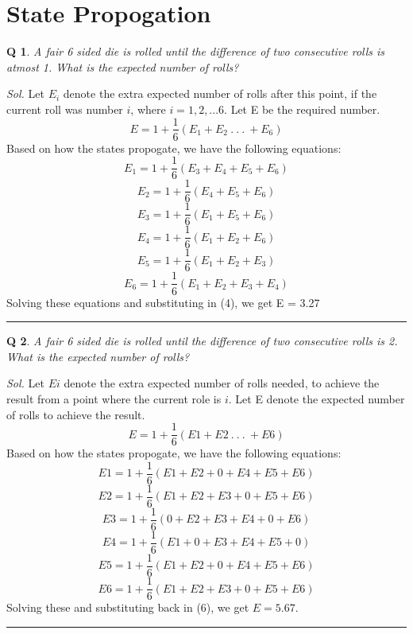 \documentclass[DIV=15, fleqn, oneside, 8pt]{scrartcl}
\theoremstyle{clean}
\newtheorem{question}{Q} %
\newenvironment{solution}
{\par\textit{Sol.} }     %
{\par\medskip\hrule\bigskip}
\begin{document}
\section*{State Propogation}
\begin{question}
A fair 6 sided die is rolled until the difference of two consecutive rolls is atmost 1. What is
the expected number of rolls?
\end{question}
\begin{solution}
Let $E_i$ denote the extra expected number of rolls after this point, if the current roll was number
$i$, where $i=1,2,...6$. Let E be the required number.
\begin{equation}
E = 1 + \frac{1}{6} (E_1 + E_2\:.\:.\:.\:+ E_6)
\end{equation}
Based on how the states propogate, we have the following equations:
\[E_1 = 1 + \frac{1}{6} (E_3 + E_4 + E_5 + E_6)\]
\[E_2 = 1 + \frac{1}{6} (E_4 + E_5 + E_6)\]
\[E_3 = 1 + \frac{1}{6} (E_1 + E_5 + E_6)\]
\[E_4 = 1 + \frac{1}{6} (E_1 + E_2 + E_6)\]
\[E_5 = 1 + \frac{1}{6} (E_1 + E_2 + E_3)\]
\[E_6 = 1 + \frac{1}{6} (E_1 + E_2 + E_3 + E_4)\]
Solving these equations and substituting in (4), we get E = 3.27
\end{solution}
\begin{question}
A fair 6 sided die is rolled until the difference of two consecutive rolls is 2. What is the 
expected number of rolls?
\end{question}
\begin{solution}
Let $Ei$ denote the extra expected number of rolls needed, to achieve the result from a point 
where the current role is $i$. Let E denote the expected number of rolls to achieve the result.
\begin{equation}
E = 1 + \frac{1}{6}(E1 + E2 \:.\:.\:.\:+E6)
\end{equation}
Based on how the states propogate, we have the following equations:
\[E1 = 1 + \frac{1}{6}(E1 + E2 + 0 + E4 + E5 + E6)\]
\[E2 = 1 + \frac{1}{6}(E1 + E2 + E3 + 0 + E5 + E6)\]
\[E3 = 1 + \frac{1}{6}(0 + E2 + E3 + E4 + 0 + E6)\]
\[E4 = 1 + \frac{1}{6}(E1 + 0 + E3 + E4 + E5 + 0)\]
\[E5 = 1 + \frac{1}{6}(E1 + E2 + 0 + E4 + E5 + E6)\]
\[E6 = 1 + \frac{1}{6}(E1 + E2 + E3 + 0 + E5 + E6)\]
Solving these and substituting back in (6), we get $E = 5.67$.
\end{solution}
\end{document}
